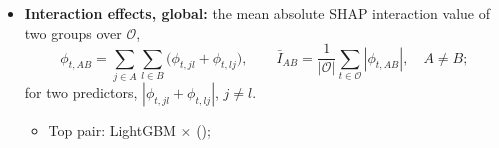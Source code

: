 \begin{itemize}
\begin{itemize}
  \item Kendall's coefficient of concordance \citep{KendallBabingtonSmith1939} over the $K$ rankings of the $n$
    groups, with rank sums
    $R_A = \sum_k r_{k,A}$ and their mean $\bar R$:
    \[
      W = \frac{12 \sum_{A} \bigl(R_A - \bar R\bigr)^2}
        {K^2 (n^3 - n) - K \sum_{k} \sum_{g \in \mathcal E_k} \bigl(|g|^3 - |g|\bigr)},
    \]
    $\mathcal E_k$ the sets of tied (equally ranked) groups at re-estimation $k$; $W = 1$: the same ranking at every
    re-estimation.
  \item LightGBM: \rhfiLgbmTopOne{} ($\bar r_A = \rhfiLgbmTopOneRank$), \rhfiLgbmTopTwo{} (\rhfiLgbmTopTwoRank),
    \rhfiLgbmTopThree{} (\rhfiLgbmTopThreeRank); Kendall's $W = \rhfiLgbmW$.
  \item XGBoost: \rhfiXgbTopOne{} (\rhfiXgbTopOneRank), \rhfiXgbTopTwo{} (\rhfiXgbTopTwoRank), \rhfiXgbTopThree{}
    (\rhfiXgbTopThreeRank); Kendall's $W = \rhfiXgbW$.
  \item Random forest: \rhfiRfTopOne{} (\rhfiRfTopOneRank), \rhfiRfTopTwo{} (\rhfiRfTopTwoRank), \rhfiRfTopThree{}
    (\rhfiRfTopThreeRank); Kendall's $W = \rhfiRfW$.
  \item Mean rank vs truncated Borda count, Spearman rank correlation over groups: \rhfiLgbmSpBorda, \rhfiXgbSpBorda,
    \rhfiRfSpBorda.
  \item Aggregate of the ranks vs rank of the aggregate, the mean absolute SHAP value over $\mathcal O$,
    $\bar I_A = |\mathcal O|^{-1} \sum_{t \in \mathcal O} |\phi_{t,A}|$: \rhfiLgbmSpGlobal, \rhfiXgbSpGlobal, \rhfiRfSpGlobal.
  \item Predictor level ($n = \rhfiP$): Kendall's $W = \rhfiLgbmWCols$, \rhfiXgbWCols, \rhfiRfWCols.
  \item Agreement of $\bar r_A$ across models (Spearman rank correlation): trees \rhfiSpTreesMin--\rhfiSpTreesMax;
    tree vs linear \rhfiSpTreeLinMin--\rhfiSpTreeLinMax; lasso vs ridge \rhfiSpLassoRidge.
  \end{itemize}
\item \textbf{Interaction effects, global:} the mean absolute SHAP interaction value of two groups over
  $\mathcal O$,
  \[
    \phi_{t,AB} = \sum_{j \in A} \sum_{l \in B} \bigl(\phi_{t,jl} + \phi_{t,lj}\bigr), \qquad
    \bar I_{AB} = \frac{1}{|\mathcal O|} \sum_{t \in \mathcal O} |\phi_{t,AB}|, \quad A \ne B;
  \]
  for two predictors, $|\phi_{t,jl} + \phi_{t,lj}|$, $j \ne l$.
  \begin{itemize}
  \item Top pair: LightGBM \rhfiLgbmInterTopA{} $\times$ \rhfiLgbmInterTopB{} (\rhfiLgbmInterTopVal);

\end{itemize}
\end{itemize}
